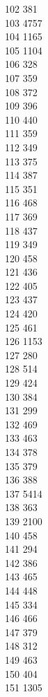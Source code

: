 { 102	381 \\
 103	4757 \\
 104	1165 \\
 105	1104 \\
 106	328 \\
 107	359 \\
 108	372 \\
 109	396 \\
 110	440 \\
 111	359 \\
 112	349 \\
 113	375 \\
 114	387 \\
 115	351 \\
 116	468 \\
 117	369 \\
 118	437 \\
 119	349 \\
 120	458 \\
 121	436 \\
 122	405 \\
 123	437 \\
 124	420 \\
 125	461 \\
 126	1153 \\
 127	280 \\
 128	514 \\
 129	424 \\
 130	384 \\
 131	299 \\
 132	469 \\
 133	463 \\
 134	378 \\
 135	379 \\
 136	388 \\
 137	5414 \\
 138	363 \\
 139	2100 \\
 140	458 \\
 141	294 \\
 142	386 \\
 143	465 \\
 144	448 \\
 145	334 \\
 146	466 \\
 147	379 \\
 148	312 \\
 149	463 \\
 150	404 \\
 151	1305 \\
}

